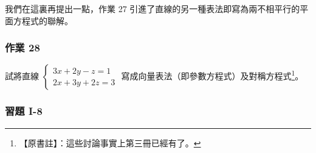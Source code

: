 我們在這裏再提出一點，作業 27 引進了直線的另一種表法即寫為兩不相平行的平面方程式的聯解。

\subsubsection*{作業 28}\label{hw:b6-1-28}
試將直線 $\left\{\begin{aligned} 3x+2y-z=1 \\ 2x+3y+2z=3 \end{aligned}\right.$ 寫成向量表法（即參數方程式）及對稱方程式\footnote{【原書註】：這些討論事實上第三冊已經有了。}。

\subsubsection*{習題 I-8}\label{sec:b6-ex1-8}

